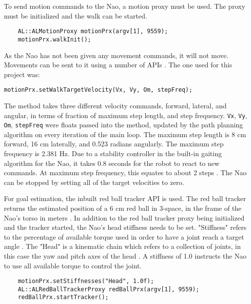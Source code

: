 To send motion commands to the Nao, a motion proxy must be used. The proxy must be initialized and the walk can be started.

\begin{lstlisting}
	AL::ALMotionProxy motionPrx(argv[1], 9559);
	motionPrx.walkInit();
\end{lstlisting}

As the Nao has not been given any movement commands, it will not move. Movements can be sent to it using a number of APIs \cite{naodoc_motion2}. The one used for this project was:

\begin{lstlisting}  
motionPrx.setWalkTargetVelocity(Vx, Vy, Om, stepFreq);
\end{lstlisting}

The method takes three different velocity commands, forward, lateral, and angular, in terms of fraction of maximum step length, and step frequency. \lstinline$Vx$, \lstinline$Vy$, \lstinline$Om$, \lstinline$stepFreq$ were floats passed into the method, updated by the path planning algorithm on every iteration of the main loop. The maximum step length is 8 cm forward, 16 cm laterally, and 0.523 radians angularly. The maximum step frequency is 2.381 Hz. Due to a stability controller in the built-in gaiting algorithm for the Nao, it takes 0.8 seconds for the robot to react to new commands. At maximum step frequency, this equates to about 2 steps \cite{naodoc_motion1}. The Nao can be stopped by setting all of the target velocities to zero.

For goal estimation, the inbuilt red ball tracker API is used. The red ball tracker returns the estimated position of a 6 cm red ball in 3-space, in the frame of the Nao's torso in meters \cite{naodoc_track1}.
In addition to the red ball tracker proxy being initialized and the tracker started, the Nao's head stiffness needs to be set. "Stiffness" refers to the percentage of available torque used in order to have a joint reach a target angle \cite{naodoc_stiff1}. The "Head" is a kinematic chain which refers to a collection of joints, in this case the yaw and pitch axes of the head \cite{naodoc_motion3}. A stiffness of 1.0 instructs the Nao to use all available torque to control the joint.

\begin{lstlisting}
	motionPrx.setStiffnesses("Head", 1.0f);
	AL::ALRedBallTrackerProxy redBallPrx(argv[1], 9559);
	redBallPrx.startTracker();
\end{lstlisting}

